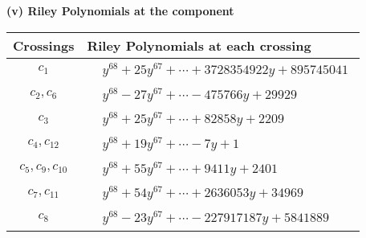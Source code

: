 \documentclass[1p]{elsarticle_modified}
\theoremstyle{definition}
\begin{document}
\flushleft \textbf{(v) Riley Polynomials at the component}\newline \\
\begin{tabular}{m{50pt}|m{274pt}}
Crossings & \hspace{64pt}Riley Polynomials at each crossing \\
\hline $$\begin{aligned}c_{1}\end{aligned}$$&$\begin{aligned}
&y^{68}+25 y^{67}+\cdots+3728354922 y+895745041
\end{aligned}$\\
\hline $$\begin{aligned}c_{2},c_{6}\end{aligned}$$&$\begin{aligned}
&y^{68}-27 y^{67}+\cdots-475766 y+29929
\end{aligned}$\\
\hline $$\begin{aligned}c_{3}\end{aligned}$$&$\begin{aligned}
&y^{68}+25 y^{67}+\cdots+82858 y+2209
\end{aligned}$\\
\hline $$\begin{aligned}c_{4},c_{12}\end{aligned}$$&$\begin{aligned}
&y^{68}+19 y^{67}+\cdots-7 y+1
\end{aligned}$\\
\hline $$\begin{aligned}c_{5},c_{9},c_{10}\end{aligned}$$&$\begin{aligned}
&y^{68}+55 y^{67}+\cdots+9411 y+2401
\end{aligned}$\\
\hline $$\begin{aligned}c_{7},c_{11}\end{aligned}$$&$\begin{aligned}
&y^{68}+54 y^{67}+\cdots+2636053 y+34969
\end{aligned}$\\
\hline $$\begin{aligned}c_{8}\end{aligned}$$&$\begin{aligned}
&y^{68}-23 y^{67}+\cdots-227917187 y+5841889
\end{aligned}$\\
\hline
\end{tabular}\\~\\
\end{document}
